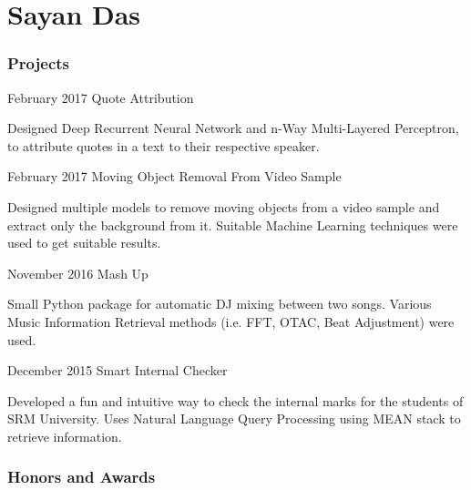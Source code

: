 \documentclass{tccv}
\begin{document}
\part{Sayan Das}

\section{Projects}

\begin{eventlist}

\item{February 2017}
     {}
     {Quote Attribution}

Designed Deep Recurrent Neural Network and n-Way Multi-Layered Perceptron, to attribute quotes in a text to their respective speaker.

\item{February 2017}
     {}
     {Moving Object Removal From Video Sample}

Designed multiple models to remove moving objects from a video sample and extract only the background from it. Suitable Machine Learning techniques were used to get suitable results.

\item{November 2016}
     {}
     {Mash Up}

Small Python package for automatic DJ mixing between two songs. Various Music Information Retrieval methods (i.e. FFT, OTAC, Beat Adjustment) were used.

\item{December 2015}
     {}
     {Smart Internal Checker}

Developed a fun and intuitive way to check the internal marks for the students of SRM University. Uses Natural Language Query Processing using MEAN stack to retrieve information.



\end{eventlist}

\section{Honors and Awards}
\end{document}

